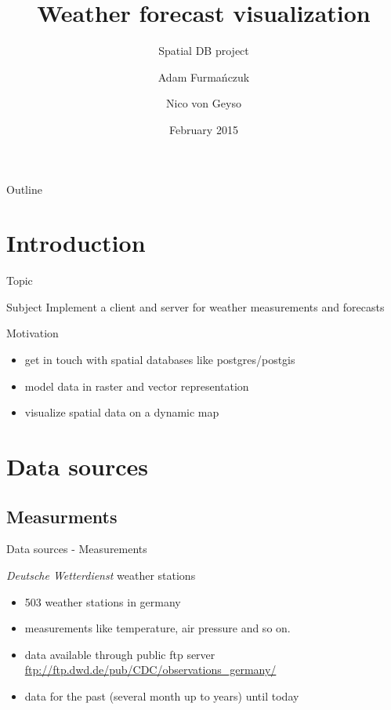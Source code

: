 \documentclass[ucs,9pt]{beamer}
\title[Short Paper Title] %
{Weather forecast visualization}
\subtitle
{Spatial DB project}
\author[Author, Another] %
{Adam Furmańczuk \and Nico von Geyso}
\institute[FU Berlin] %
{Freie Universität Berlin}
\date[CFP 2003] %
{February 2015}
\begin{document}
\begin{frame}[plain]
  \titlepage
\end{frame}

\begin{frame}{Outline}
  \tableofcontents
\end{frame}

\section{Introduction}

\begin{frame}{Topic}
  \begin{block}{Subject}
    Implement a client and server for weather measurements and forecasts
  \end{block}

  \begin{block}{Motivation}
    \begin{itemize}
      \item get in touch with spatial databases like postgres/postgis
      \item model data in raster and vector representation
      \item visualize spatial data on a dynamic map
    \end{itemize}
  \end{block}
\end{frame}

\section{Data sources}
\subsection{Measurments}
\begin{frame}{Data sources - Measurements}
  \begin{block}{\textit{Deutsche Wetterdienst} weather stations}
    \begin{itemize}
        \item 503 weather stations in germany
        \item measurements like temperature, air pressure and so on.
        \item data available through public ftp server \\
          \vspace{0.1cm}
          \url{ftp://ftp.dwd.de/pub/CDC/observations_germany/}
        \item data for the past (several month up to years) until today
    \end{itemize}
  \end{block}
\end{frame}
\end{document}

